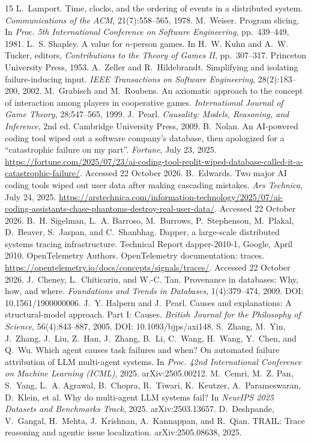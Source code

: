 \documentclass[11pt]{article}
\begin{document}
\begin{thebibliography}{15}\small
{} L.~Lamport. Time, clocks, and the ordering of events in a distributed system. \emph{Communications of the ACM}, 21(7):558--565, 1978.
 M.~Weiser. Program slicing. In \emph{Proc. 5th International Conference on Software Engineering}, pp.~439--449, 1981.
 L.~S. Shapley. A value for $n$-person games. In H.~W. Kuhn and A.~W. Tucker, editors, \emph{Contributions to the Theory of Games II}, pp.~307--317. Princeton University Press, 1953.
 A.~Zeller and R.~Hildebrandt. Simplifying and isolating failure-inducing input. \emph{IEEE Transactions on Software Engineering}, 28(2):183--200, 2002.
 M.~Grabisch and M.~Roubens. An axiomatic approach to the concept of interaction among players in cooperative games. \emph{International Journal of Game Theory}, 28:547--565, 1999.
 J.~Pearl. \emph{Causality: Models, Reasoning, and Inference}, 2nd ed. Cambridge University Press, 2009.
 B.~Nolan. An AI-powered coding tool wiped out a software company's database, then apologized for a ``catastrophic failure on my part''. \emph{Fortune}, July 23, 2025. \url{https://fortune.com/2025/07/23/ai-coding-tool-replit-wiped-database-called-it-a-catastrophic-failure/}. Accessed 22 October 2026.
 B.~Edwards. Two major AI coding tools wiped out user data after making cascading mistakes. \emph{Ars Technica}, July 24, 2025. \url{https://arstechnica.com/information-technology/2025/07/ai-coding-assistants-chase-phantoms-destroy-real-user-data/}. Accessed 22 October 2026.
 B.~H. Sigelman, L.~A. Barroso, M.~Burrows, P.~Stephenson, M.~Plakal, D.~Beaver, S.~Jaspan, and C.~Shanbhag. Dapper, a large-scale distributed systems tracing infrastructure. Technical Report dapper-2010-1, Google, April 2010.
 OpenTelemetry Authors. OpenTelemetry documentation: traces. \url{https://opentelemetry.io/docs/concepts/signals/traces/}. Accessed 22 October 2026.
 J.~Cheney, L.~Chiticariu, and W.-C. Tan. Provenance in databases: Why, how, and where. \emph{Foundations and Trends in Databases}, 1(4):379--474, 2009. DOI: 10.1561/1900000006.
 J.~Y. Halpern and J.~Pearl. Causes and explanations: A structural-model approach. Part I: Causes. \emph{British Journal for the Philosophy of Science}, 56(4):843--887, 2005. DOI: 10.1093/bjps/axi148.
 S.~Zhang, M.~Yin, J.~Zhang, J.~Liu, Z.~Han, J.~Zhang, B.~Li, C.~Wang, H.~Wang, Y.~Chen, and Q.~Wu. Which agent causes task failures and when? On automated failure attribution of LLM multi-agent systems. In \emph{Proc. 42nd International Conference on Machine Learning (ICML)}, 2025. arXiv:2505.00212.
 M.~Cemri, M.~Z. Pan, S.~Yang, L.~A. Agrawal, B.~Chopra, R.~Tiwari, K.~Keutzer, A.~Parameswaran, D.~Klein, et al. Why do multi-agent LLM systems fail? In \emph{NeurIPS 2025 Datasets and Benchmarks Track}, 2025. arXiv:2503.13657.
 D.~Deshpande, V.~Gangal, H.~Mehta, J.~Krishnan, A.~Kannappan, and R.~Qian. TRAIL: Trace reasoning and agentic issue localization. arXiv:2505.08638, 2025.
\end{thebibliography}
\end{document}
